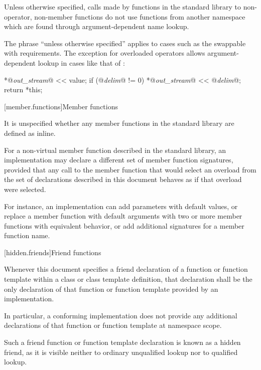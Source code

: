 \pnum
Unless otherwise specified,
calls made by functions in the standard library to non-operator, non-member functions
do not use functions from another namespace which are found through
argument-dependent name lookup.
\begin{note}
The phrase ``unless otherwise specified'' applies to cases such as
the swappable with requirements.
The exception for overloaded operators allows argument-dependent lookup
in cases like that of
:

\effects
\begin{codeblock}
*@\textit{out_stream}@ << value;
if (@\textit{delim}@ != 0)
  *@\textit{out_stream}@ << @\textit{delim}@;
return *this;
\end{codeblock}
\end{note}

[member.functions]{Member functions}

\pnum
It is unspecified whether any member functions in the \Cpp{} standard library are defined as
inline.

\pnum
For a non-virtual member function described in the \Cpp{} standard library,
an implementation may declare a different set of member function signatures,
provided that any call to the member function that would select
an overload from the set of declarations described in this document
behaves as if that overload were selected.
\begin{note}
For instance, an implementation can add parameters with default values,
or replace a member function with default arguments
with two or more member functions with equivalent behavior,
or add additional signatures for a member function name.
\end{note}

[hidden.friends]{Friend functions}

\pnum
Whenever this document specifies
a friend declaration of a function or function template
within a class or class template definition,
that declaration shall be
the only declaration of that function or function template
provided by an implementation.
\begin{note}
In particular,
a conforming implementation does not provide
any additional declarations of that function or function template
at namespace scope.
\end{note}
\begin{note}
Such a friend function or function template declaration
is known as a hidden friend,
as it is visible neither
to ordinary unqualified lookup nor
to qualified lookup.
\end{note}

